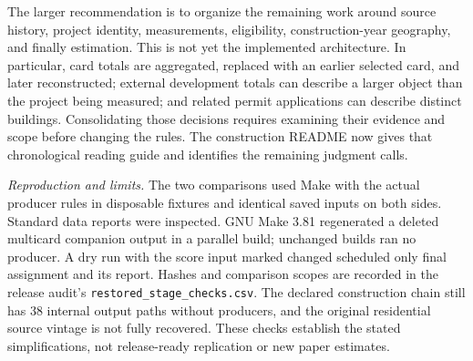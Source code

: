 The larger recommendation is to organize the remaining work around source history,
project identity, measurements, eligibility, construction-year geography, and
finally estimation. This is not yet the implemented architecture. In particular,
card totals are aggregated, replaced with an earlier selected card, and later
reconstructed; external development totals can describe a larger object than the
project being measured; and related permit applications can describe distinct
buildings. Consolidating those decisions requires examining their evidence and
scope before changing the rules. The construction README now gives that
chronological reading guide and identifies the remaining judgment calls.

\small
\textit{Reproduction and limits.} The two comparisons used Make with the actual
producer rules in disposable fixtures and identical saved inputs on both sides.
Standard data reports were inspected. GNU Make 3.81 regenerated a deleted multicard
companion output in a parallel build; unchanged builds ran no producer. A dry run
with the score input marked changed scheduled only final assignment and its report.
Hashes and comparison scopes are recorded in the release audit's
\texttt{restored\_stage\_checks.csv}. The declared construction chain still has
38 internal output paths without producers, and the original residential source
vintage is not fully recovered. These checks establish the stated simplifications,
not release-ready replication or new paper estimates.
\normalsize
